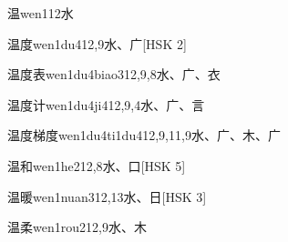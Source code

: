 \begin{EntryWithPhonetic}{温}{wen1}{12}{⽔}
\end{EntryWithPhonetic}

\begin{EntryWithPhonetic}{温度}{wen1du4}{12,9}{⽔、⼴}[HSK 2]
\end{EntryWithPhonetic}

\begin{EntryWithPhonetic}{温度表}{wen1du4biao3}{12,9,8}{⽔、⼴、⾐}
\end{EntryWithPhonetic}

\begin{EntryWithPhonetic}{温度计}{wen1du4ji4}{12,9,4}{⽔、⼴、⾔}
\end{EntryWithPhonetic}

\begin{EntryWithPhonetic}{温度梯度}{wen1du4ti1du4}{12,9,11,9}{⽔、⼴、⽊、⼴}
\end{EntryWithPhonetic}

\begin{EntryWithPhonetic}{温和}{wen1he2}{12,8}{⽔、⼝}[HSK 5]
\end{EntryWithPhonetic}

\begin{EntryWithPhonetic}{温暖}{wen1nuan3}{12,13}{⽔、⽇}[HSK 3]
\end{EntryWithPhonetic}

\begin{EntryWithPhonetic}{温柔}{wen1rou2}{12,9}{⽔、⽊}
\end{EntryWithPhonetic}

